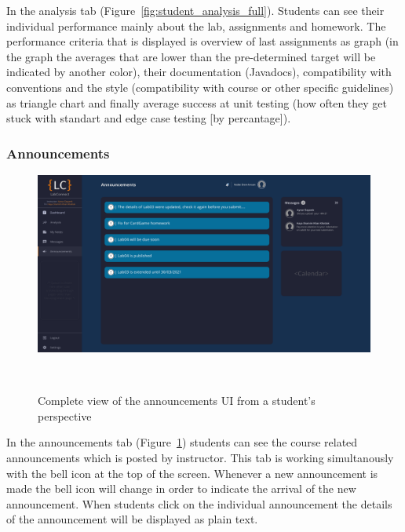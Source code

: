 \documentclass[a4paper, 12pt]{article}
\begin{document}
    In the analysis tab (Figure~\ref{fig:student_analysis_full}). Students can see their individual performance mainly about the lab, assignments and homework.
    The performance criteria that is displayed is overview of last assignments as graph (in the graph the averages that are lower than the 
    pre-determined target will be indicated by another color), their documentation (Javadocs), compatibility with conventions and the style 
    (compatibility with course or other specific guidelines) as triangle chart and finally average success at unit testing (how often they 
    get stuck with standart and edge case testing [by percantage]).

    
    \pagebreak
    
    \subsubsection{Announcements}
    
    \begin{figure}[H]
        \centering
        \includegraphics[width=\textwidth]{student_announcements}
        \caption{Complete view of the announcements UI from a student's perspective}~\label{fig:student_announcements_full}
    \end{figure}
    
    In the announcements tab (Figure~\ref{fig:student_announcements_full}) students can see the course related announcements which is posted by instructor. This tab is working simultanously
    with the bell icon at the top of the screen. Whenever a new announcement is made the bell icon will change in order to indicate the arrival of the 
    new announcement. When students click on the individual announcement the details of the announcement will be displayed as plain text.
    
    
    \pagebreak
    
\end{document}
